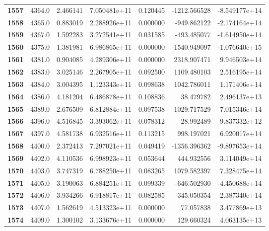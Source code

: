 \documentclass{report}[12pt]
\begin{document}
\begin{center}
\begin{tabular}{lrrrrrr}
\textbf{1557} &         4364.0 &   2.466141 &  7.050481e+11 &    0.120445 & -1212.566528 & -8.549177e+14 \\
\textbf{1558} &         4365.0 &   0.883019 &  2.288926e+11 &    0.000000 &  -949.862122 & -2.174164e+14 \\
\textbf{1559} &         4367.0 &   1.592283 &  3.272541e+11 &    0.031585 &  -493.485077 & -1.614950e+14 \\
\textbf{1560} &         4375.0 &   1.381981 &  6.986865e+11 &    0.000000 & -1540.949097 & -1.076640e+15 \\
\textbf{1561} &         4381.0 &   0.904085 &  4.289306e+11 &    0.000000 &  2318.907471 &  9.946503e+14 \\
\textbf{1562} &         4383.0 &   3.025146 &  2.267905e+11 &    0.092500 &  1109.480103 &  2.516195e+14 \\
\textbf{1563} &         4384.0 &   3.004395 &  1.123343e+11 &    0.098638 &  1042.786011 &  1.171406e+14 \\
\textbf{1564} &         4386.0 &   4.181204 &  6.486878e+11 &    0.108836 &    38.479782 &  2.496137e+13 \\
\textbf{1565} &         4389.0 &   2.676509 &  6.812884e+11 &    0.097538 &  1029.717529 &  7.015346e+14 \\
\textbf{1566} &         4396.0 &   4.516845 &  3.393062e+11 &    0.078312 &    28.992489 &  9.837332e+12 \\
\textbf{1567} &         4397.0 &   4.581738 &  6.932516e+11 &    0.113215 &   998.197021 &  6.920017e+14 \\
\textbf{1568} &         4400.0 &   2.372413 &  7.297021e+11 &    0.049419 & -1356.396362 & -9.897653e+14 \\
\textbf{1569} &         4402.0 &   4.110536 &  6.998923e+11 &    0.053644 &   444.932556 &  3.114049e+14 \\
\textbf{1570} &         4403.0 &   3.747319 &  6.788250e+11 &    0.083265 &  1079.582397 &  7.328475e+14 \\
\textbf{1571} &         4405.0 &   3.190063 &  6.884251e+11 &    0.099339 &  -646.502930 & -4.450688e+14 \\
\textbf{1572} &         4406.0 &   3.934266 &  6.918817e+11 &    0.082585 &  -345.050354 & -2.387340e+14 \\
\textbf{1573} &         4407.0 &   1.562619 &  4.513323e+11 &    0.000000 &    77.057838 &  3.477869e+13 \\
\textbf{1574} &         4409.0 &   1.300102 &  3.133676e+11 &    0.000000 &   129.660324 &  4.063135e+13 \\

\end{tabular}
\end{center}
\end{document}
